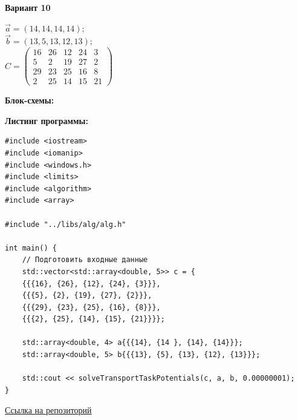 \documentclass[a4paper,14pt]{extarticle}
\begin{document}
\begin{center}
    \textbf{Вариант 10}
\end{center}
\begin{center}
    $\vec{a}=(14,14,14,14);$\\
    $\vec{b}=(13,5,13,12,13);$\\
    $C = \begin{pmatrix}
        16&26&12&24&3\\
        5&2&19&27&2\\
        29&23&25&16&8\\
        2&25&14&15&21
    \end{pmatrix}$\\
\end{center}

\textbf{Блок-схемы: }
\begin{center}
    \bigbreak
    \bigbreak
    \bigbreak
    \bigbreak
    \bigbreak
    \bigbreak
    \bigbreak
    \bigbreak
\end{center}

\textbf{Листинг программы: }
\begin{verbatim}
#include <iostream>
#include <iomanip>
#include <windows.h>
#include <limits>
#include <algorithm>
#include <array>

#include "../libs/alg/alg.h"

int main() {
    // Подготовить входные данные
    std::vector<std::array<double, 5>> c = {
    {{{16}, {26}, {12}, {24}, {3}}},
    {{{5}, {2}, {19}, {27}, {2}}},
    {{{29}, {23}, {25}, {16}, {8}}},
    {{{2}, {25}, {14}, {15}, {21}}}};
    
    std::array<double, 4> a{{{14}, {14 }, {14}, {14}}};
    std::array<double, 5> b{{{13}, {5}, {13}, {12}, {13}}};

    std::cout << solveTransportTaskPotentials(c, a, b, 0.00000001);
}
\end{verbatim}
\href{https://github.com/IAmProgrammist/operations_research/blob/master/src/lab4/main.cpp}{Ссылка на репозиторий}\\
\end{document}
